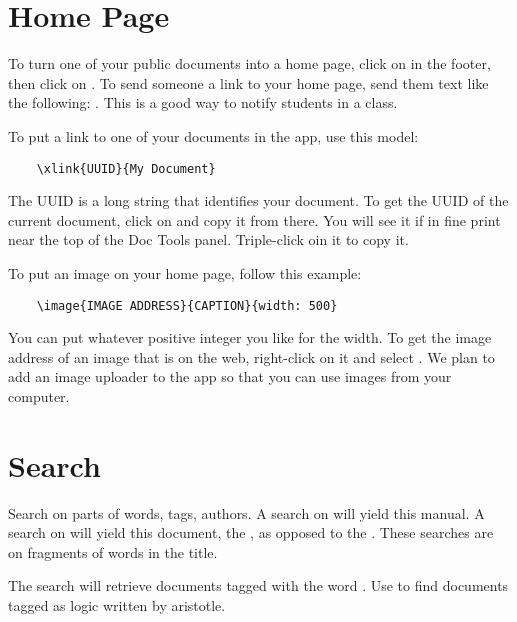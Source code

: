 \section{Home Page}

To turn one of your public documents into a home page, click on  in the footer, then click on .  To send someone a link to your home page, send them text like the following: .  This is a good way to notify students in a class.

 To put a link to one of your documents in the app, use this model: 

\begin{verbatim}
    \xlink{UUID}{My Document}
\end{verbatim}

The UUID is a long string that identifies your document.  To get the UUID of the current document, click on  and copy it from there. You will see it if in fine print near the top of the  Doc Tools panel.  Triple-click oin it to copy it.

 To put an image on your home page, follow this example:

\begin{verbatim}
    \image{IMAGE ADDRESS}{CAPTION}{width: 500}
\end{verbatim}

You can put whatever positive integer you like for the width.  To get the image address of an image that is on the web, right-click on it and select .  We plan to add an image uploader to the app so that you can use images from your computer.

\section{Search}

Search on parts of words, tags, authors.  A search on  will yield this manual.  A search on  will yield this document, the , as opposed to the .  These searches are on fragments of words in the title.  

The search  will retrieve documents tagged with the word .  Use  to find documents tagged as logic written by aristotle.



